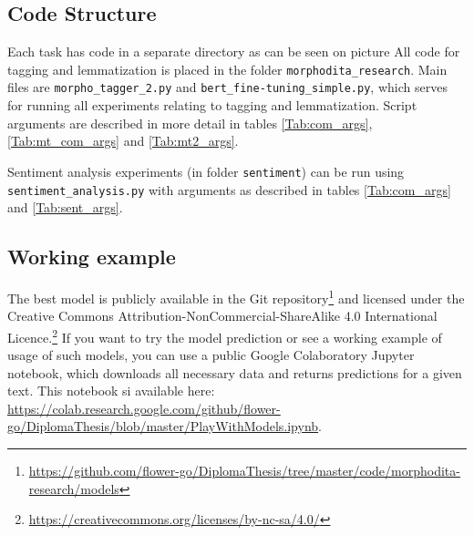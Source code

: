 \subsection{Code Structure}
Each task has code in a separate directory as can be seen on picture %
All code for tagging and lemmatization is placed in the folder \texttt{morphodita\_research}. Main files are \texttt{morpho\_tagger\_2.py} and \texttt{bert\_fine-tuning\_simple.py}, which serves for running all experiments relating to tagging and lemmatization. Script arguments are described in more detail in tables \ref{Tab:com_args}, \ref{Tab:mt_com_args} and \ref{Tab:mt2_args}.
\par
Sentiment analysis experiments (in folder \texttt{sentiment}) can be run using \texttt{sentiment\_analysis.py} with arguments as described in tables \ref{Tab:com_args} and \ref{Tab:sent_args}.

\subsection{Working example}
The best model is publicly available in the Git repository\footnote{\url{https://github.com/flower-go/DiplomaThesis/tree/master/code/morphodita-research/models}} %
 and licensed under the Creative Commons Attribution-NonCommercial-ShareAlike 4.0 International Licence.\footnote{\url{https://creativecommons.org/licenses/by-nc-sa/4.0/}} If you want to try the model prediction or see a working example of usage of such models, you can use a public Google Colaboratory \citep{colab} Jupyter notebook, which downloads all necessary data and returns predictions for a given text. This notebook si available here: \url{https://colab.research.google.com/github/flower-go/DiplomaThesis/blob/master/PlayWithModels.ipynb}. 


